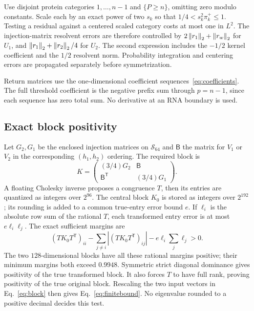 Use disjoint protein categories $1,\ldots,n-1$ and $\{P\geq n\}$,
omitting zero modulo constants. Scale each by an exact power of two
$s_k$ so that $1/4<s_k^2\pi_k^+\leq1$.
Testing a residual against a centered scaled category costs at most
one in $L^2$. The injection-matrix resolvent errors are therefore
controlled by $2\left\lVert r_1\right\rVert_2+\left\lVert r_w\right\rVert_2$ for $U_1$, and
$\left\lVert r_1\right\rVert_2+\left\lVert r_2\right\rVert_2/4$ for $U_2$.
The second expression includes the $-1/2$ kernel coefficient and
the $1/2$ resolvent norm. Probability integration and centering
errors are propagated separately before symmetrization.

Return matrices use the one-dimensional coefficient
sequences~\eqref{eq:coefficients}. The full threshold coefficient is
the negative prefix sum through $p=n-1$, since each sequence has
zero total sum. No derivative at an RNA boundary is used.

\subsection{Exact block positivity}

Let $G_2,G_1$ be the enclosed injection matrices on
$\mathcal S_{64}$ and $\mathsf B$ the matrix for $V_1$ or $V_2$ in
the corresponding $(h_1,h_2)$ ordering. The required block is
\begin{equation}
 K=\begin{pmatrix}
      (3/4)G_2&\mathsf B\\
      \mathsf B^{\mathsf T}&(3/4)G_1
    \end{pmatrix}.
 \label{eq:block}
\end{equation}
A floating Cholesky inverse proposes a congruence $T$, then its
entries are quantized as integers over $2^{96}$. The central block
$K_0$ is stored as integers over $2^{192}$; its rounding is added to
a common true-entry error bound $e$. If $\ell_i$ is the absolute
row sum of the rational $T$, each transformed entry error is at most
$e\ell_i\ell_j$. The exact sufficient margins are
\begin{equation}
 (TK_0T^{\mathsf T})_{ii}
 -\sum_{j\ne i}|(TK_0T^{\mathsf T})_{ij}|
 -e\ell_i\sum_j\ell_j>0.
 \label{eq:margin}
\end{equation}
The two $128$-dimensional blocks have all these rational margins
positive; their minimum margins both exceed $0.9948$.
Symmetric strict diagonal dominance gives positivity of the true
transformed block. It also forces $T$ to have full rank, proving
positivity of the true original block. Rescaling the two input
vectors in Eq.~\eqref{eq:block} then gives Eq.~\eqref{eq:finitebound}.
No eigenvalue rounded to a positive decimal decides this test.


